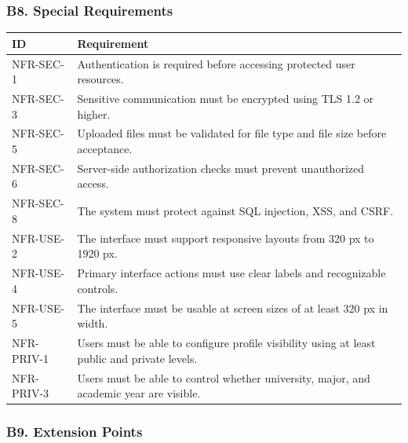 \documentclass[12pt]{article}
\renewcommand{\baselinestretch}{1.5}
\begin{document}
\hypertarget{sec:b8-special-requirements}{}
\subsubsection*{B8. Special Requirements}
\par\medskip

\begingroup
\small
\renewcommand{\baselinestretch}{1.0}\selectfont
\renewcommand{\arraystretch}{1.15}
\setlength{\tabcolsep}{6pt}
\begin{longtable}{|>{\raggedright\arraybackslash}p{}|>{\raggedright\arraybackslash}p{}|}
\hline
\textbf{ID} & \textbf{Requirement} \\ \hline
\endhead
NFR-SEC-1 & Authentication is required before accessing protected user resources. \\ \hline
NFR-SEC-3 & Sensitive communication must be encrypted using TLS 1.2 or higher. \\ \hline
NFR-SEC-5 & Uploaded files must be validated for file type and file size before acceptance. \\ \hline
NFR-SEC-6 & Server-side authorization checks must prevent unauthorized access. \\ \hline
NFR-SEC-8 & The system must protect against SQL injection, XSS, and CSRF. \\ \hline
NFR-USE-2 & The interface must support responsive layouts from 320 px to 1920 px. \\ \hline
NFR-USE-4 & Primary interface actions must use clear labels and recognizable controls. \\ \hline
NFR-USE-5 & The interface must be usable at screen sizes of at least 320 px in width. \\ \hline
NFR-PRIV-1 & Users must be able to configure profile visibility using at least public and private levels. \\ \hline
NFR-PRIV-3 & Users must be able to control whether university, major, and academic year are visible. \\ \hline
\end{longtable}
\endgroup
\par\medskip

\hypertarget{sec:b9-extension-points}{}
\subsubsection*{B9. Extension Points}
\par\medskip
\end{document}
